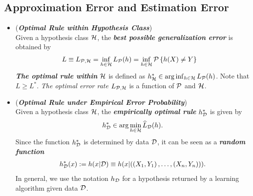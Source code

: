 \documentclass[11pt]{article}
\begin{document}
\subsection{Approximation Error and Estimation Error}
\begin{itemize}
\item \begin{remark} (\emph{\textbf{Optimal Rule within Hypothesis Class}})\\
Given a hypothesis class ${\mathcal H}$, the \emph{\textbf{best possible generalization error}} is obtained by
\begin{align*}
L \equiv L_{{\mathcal P}, {\mathcal H}} &= \inf_{h \in {\mathcal H}}L_{{\mathcal P}}(h)  = \inf_{h \in {\mathcal H}}{\mathcal P}\left\{h(X) \neq Y\right\}
\end{align*} \textbf{\emph{The optimal rule within}} ${\mathcal H}$ is defined as $h_{{\mathcal H}}^{*} \in \arg \inf_{h \in {\mathcal H}}L_{{\mathcal P}}(h) $. Note that $L \ge L^{*}$. \emph{The optimal error rate} $L_{{\mathcal P}, {\mathcal H}}$ is a function of ${\mathcal P}$ and ${\mathcal H}$.
\end{remark}

\item \begin{remark} (\emph{\textbf{Optimal Rule under Empirical Error Probability}})\\
Given a hypothesis class ${\mathcal H}$, the \emph{\textbf{empirically optimal rule}} $h_{{\mathcal D}}^{*}$ is given by 
\begin{align*}
h_{{\mathcal D}}^{*}  \in \arg\min_{h \in {\mathcal H}}\widehat{L}_{{\mathcal D}}(h).
\end{align*} Since the function $h_{{\mathcal D}}^{*}$ is determined by data ${\mathcal D}$, it can be seen as a \emph{\textbf{random function}}
\begin{align*}
h_{{\mathcal D}}^{*}(x) := h(x | {\mathcal D}) \equiv  h(x | ((X_1, Y_1) \,{,}\ldots{,}\, (X_n, Y_n)) ).
\end{align*} In general, we use the notation $h_{{\mathcal D}}$ for a hypothesis returned by a learning algorithm given data ${\mathcal D}$.
\end{remark}


\end{itemize}
\end{document}
